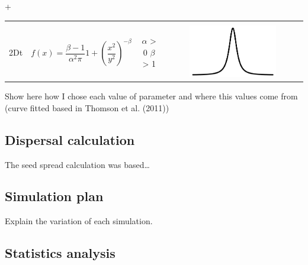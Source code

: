 +\documentclass[12pt]{article}
\begin{document}
\begin{longtable}[]{@{}lrcc@{}}
\begin{minipage}[t]{0.18\columnwidth}
\end{minipage}\tabularnewline
\begin{minipage}[t]{0.17\columnwidth}\raggedright\strut
2Dt\strut
\end{minipage} & \begin{minipage}[t]{0.15\columnwidth}\raggedleft\strut
\[ f(x) = \frac{\beta - 1}{\alpha^2 \pi} 1 + (\frac{x^2}{y^2})^{-\beta} \]\strut
\end{minipage} & \begin{minipage}[t]{0.16\columnwidth}\centering\strut
\(\alpha\) \textgreater{} 0 \(\beta\) \textgreater{} 1\strut
\end{minipage} & \begin{minipage}[t]{0.18\columnwidth}\centering\strut
\includegraphics[width=0.65000\textwidth]{figure/2dt.pdf}\strut
\end{minipage}\tabularnewline
\bottomrule
\end{longtable}

Show here how I chose each value of parameter and where this values come
from (curve fitted based in Thomson et al. (2011))

\subsection{Dispersal calculation}\label{dispersal-calculation}

The seed spread calculation was based\ldots{}

\subsection{Simulation plan}\label{simulation-plan}

Explain the variation of each simulation.

\subsection{Statistics analysis}\label{statistics-analysis}
\end{document}
